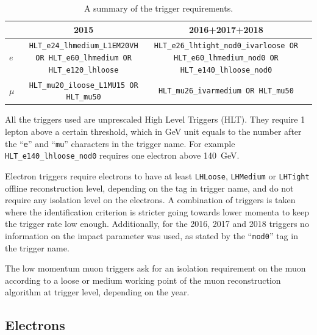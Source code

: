 \begin{table}[htbp]
  \begin{center}
    \small
    \resizebox{\textwidth}{!}%
    {%
      \begin{tabular}{ l c c c }
        \toprule
                    & 2015                                                                     & 2016+2017+2018                                                                            \\
        \midrule
        \( e \)     & \texttt{HLT\_e24\_lhmedium\_L1EM20VH OR HLT\_e60\_lhmedium OR HLT\_e120\_lhloose} & \texttt{HLT\_e26\_lhtight\_nod0\_ivarloose OR HLT\_e60\_lhmedium\_nod0 OR HLT\_e140\_lhloose\_nod0} \\
        \( \mu \)   & \texttt{HLT\_mu20\_iloose\_L1MU15 OR HLT\_mu50}   & \texttt{HLT\_mu26\_ivarmedium OR HLT\_mu50}                                               \\
        \bottomrule
      \end{tabular}
    }
  \end{center}

  \caption{A summary of the trigger requirements.}%
  \label{tab:trigger-analysis}
\end{table}

All the triggers used are unprescaled High Level Triggers (HLT).
They require 1 lepton above a certain \pt threshold, which in GeV unit equals
to the number after the ``\texttt{e}'' and ``\texttt{mu}'' characters in the
trigger name. For example \texttt{HLT\_e140\_lhloose\_nod0} requires
one electron above \qty{140}{\GeV}.

Electron triggers require electrons to have at least \texttt{LHLoose},
\texttt{LHMedium} or \texttt{LHTight} offline reconstruction level, depending
on the tag in trigger name, and do not require any isolation level on the
electrons. A combination of triggers is taken where the identification criterion
is stricter going towards lower momenta to keep the trigger rate low enough.
Additionally, for the 2016, 2017 and 2018 triggers no information on the
impact parameter \dzero was used, as stated by the ``\texttt{nod0}'' tag in
the trigger name.

The low momentum muon triggers ask for an isolation requirement on the muon
according to a loose or medium working point of the muon reconstruction
algorithm at trigger level, depending on the year.

\subsection{Electrons}%
\label{sec:definitions-electrons}

